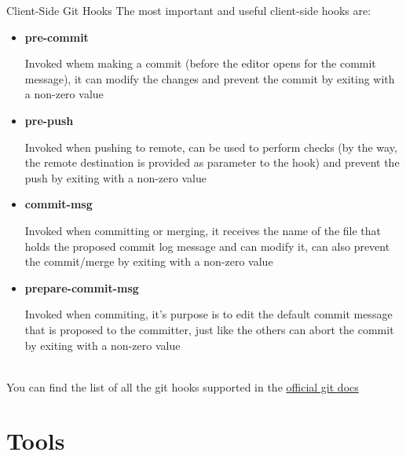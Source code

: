 \documentclass[11pt]{beamer}
\begin{document}
\begin{frame}{Client-Side Git Hooks}
  The most important and useful client-side hooks are:
  \begin{itemize}
    \item \textbf{pre-commit} \\
      \begin{tiny}
  		Invoked whem making a commit (before the editor opens for the commit message), it can modify the changes and
  		prevent the commit by exiting with a non-zero value
  		\par
      \end{tiny}
    \item \textbf{pre-push} \\
      \begin{tiny}
       Invoked when pushing to remote, can be used to perform checks (by the way, the remote destination is provided as parameter to
       the hook) and prevent the push by exiting with a non-zero value
       \par
      \end{tiny}
    \item \textbf{commit-msg} \\
	  \begin{tiny}
       Invoked when committing or merging, it receives the name of the file that holds the proposed commit log message and can modify it,
       can also prevent the commit/merge by exiting with a non-zero value
       \par
      \end{tiny}
    \item \textbf{prepare-commit-msg} \\
      \begin{tiny}
        Invoked when commiting, it's purpose is to edit the default commit message that is proposed to the committer,
        just like the others can abort the commit by exiting with a non-zero value 
        \par
      \end{tiny}
  \end{itemize}
  ~\\
  You can find the list of all the git hooks supported in the
  {\color{purple} \href{https://git-scm.com/docs/githooks\#_hooks}{official git docs}}
\end{frame}






\section{Tools}
\end{document}
